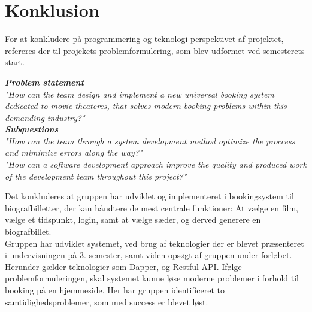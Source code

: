 \chapter{Konklusion}\label{ch:konklusion}
For at konkludere på programmering og teknologi perspektivet af projektet, refereres der til projekets problemformulering,
som blev udformet ved semesterets start.

\begin{center}
\textit{\textbf{Problem statement} \\
"How can the team design and implement a new universal booking system dedicated to movie theateres, 
that solves modern booking problems within this demanding industry?"} \\

\textit{\textbf{Subquestions}\\
"How can the team through a system development method optimize the proccess and mimimize errors along the way?"}\\

\textit{"How can a software development approach improve the quality and 
produced work of the development team throughout this project?"}\\
\end{center} 

Det konkluderes at gruppen har udviklet og implementeret i bookingsystem til biografbilletter, der kan håndtere de 
mest centrale funktioner: At vælge en film, vælge et tidspunkt, login, samt at vælge sæder, og derved generere en 
biografbillet. \\


Gruppen har udviklet systemet, ved brug af teknologier der er blevet præsenteret i undervisningen på 3. semester, 
samt viden opsøgt af gruppen under forløbet. 
Herunder gælder teknologier som Dapper, og Restful API. Ifølge problemformuleringen, skal systemet kunne løse 
moderne problemer i forhold til booking på en hjemmeside. Her har gruppen identificeret to samtidighedsproblemer, som med success er blevet løst. \\


